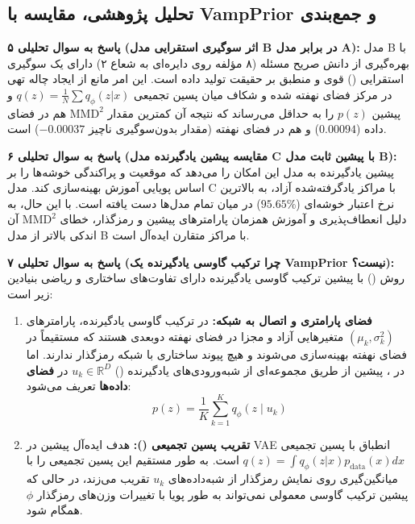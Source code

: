 \subsection{تحلیل پژوهشی، مقایسه با VampPrior و جمع‌بندی}
\label{sec:q2-research}

\textbf{پاسخ به سوال تحلیلی ۵ (اثر سوگیری استقرایی مدل B در برابر مدل A):}
مدل B با بهره‌گیری از دانش صریح مسئله (۸ مؤلفه روی دایره‌ای به شعاع ۲) دارای یک سوگیری استقرایی () قوی و منطبق بر حقیقت تولید داده است. این امر مانع از ایجاد چاله تهی در مرکز فضای نهفته شده و شکاف میان پسین تجمیعی $q(z) = \frac{1}{N}\sum q_\phi(z|x)$ و پیشین $p(z)$ را به حداقل می‌رساند که نتیجه آن کمترین مقدار $\text{MMD}^2$ هم در فضای داده ($0.00094$) و هم در فضای نهفته (مقدار بدون‌سوگیری ناچیز $-0.00037$) است.

\textbf{پاسخ به سوال تحلیلی ۶ (مقایسه پیشین یادگیرنده مدل C با پیشین ثابت مدل B):}
پیشین یادگیرنده به مدل این امکان را می‌دهد که موقعیت و پراکندگی خوشه‌ها را بر اساس پویایی آموزش بهینه‌سازی کند. مدل C با مراکز یادگرفته‌شده آزاد، به بالاترین نرخ اعتبار خوشه‌ای ($95.65\%$) در میان تمام مدل‌ها دست یافته است. با این حال، به دلیل انعطاف‌پذیری و آموزش همزمان پارامترهای پیشین و رمزگذار، خطای $\text{MMD}^2$ آن اندکی بالاتر از مدل B با مراکز متقارن ایده‌آل است.

\textbf{پاسخ به سوال تحلیلی ۷ (چرا ترکیب گاوسی یادگیرنده یک VampPrior نیست؟):}
روش  (\cite{tomczak2018vampprior}) با پیشین ترکیب گاوسی یادگیرنده دارای تفاوت‌های ساختاری و ریاضی بنیادین زیر است:
\begin{enumerate}
  \item \textbf{فضای پارامتری و اتصال به شبکه:} در ترکیب گاوسی یادگیرنده، پارامترهای $(\mu_k, \sigma_k^2)$ متغیرهایی آزاد و مجزا در فضای نهفته دوبعدی هستند که مستقیماً در فضای نهفته بهینه‌سازی می‌شوند و هیچ پیوند ساختاری با شبکه رمزگذار ندارند. اما در ، پیشین از طریق مجموعه‌ای از شبه‌ورودی‌های یادگیرنده () $u_k \in \mathbb{R}^{D}$ در \textbf{فضای داده‌ها} تعریف می‌شود:
  \begin{equation}
    p(z) = \frac{1}{K}\sum_{k=1}^K q_\phi(z \mid u_k)
  \end{equation}
  \item \textbf{تقریب پسین تجمیعی ():} هدف ایده‌آل پیشین در VAE انطباق با پسین تجمیعی $q(z) = \int q_\phi(z|x)p_{\text{data}}(x)dx$ است.  به طور مستقیم این پسین تجمیعی را با میانگین‌گیری روی نمایش رمزگذار از شبه‌داده‌های $u_k$ تقریب می‌زند، در حالی که پیشین ترکیب گاوسی معمولی نمی‌تواند به طور پویا با تغییرات وزن‌های رمزگذار $\phi$ همگام شود.
\end{enumerate}

